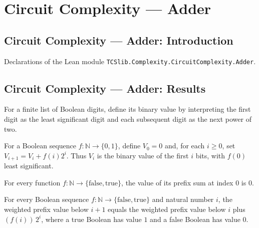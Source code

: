 \section{Circuit Complexity --- Adder}
\subsection*{Circuit Complexity --- Adder: Introduction}

Declarations of the Lean module \texttt{TCSlib.Complexity.CircuitComplexity.Adder}.

\subsection*{Circuit Complexity --- Adder: Results}

\begin{definition}
\label{BoolCircuit.bitsVal}
\leanok
For a finite list of Boolean digits, define its binary value by interpreting the first
digit as the least significant digit and each subsequent digit as the next power of two.
\end{definition}

\begin{definition}
\label{BoolCircuit.prefixVal}
\leanok
For a Boolean sequence $f:\mathbb N\to\{0,1\}$, define $V_0=0$ and, for each $i\ge0$,
set $V_{i+1}=V_i+f(i)2^i$. Thus $V_i$ is the binary value of the first $i$ bits, with
$f(0)$ least significant.
\end{definition}

\begin{theorem}
\label{BoolCircuit.prefixVal_zero}
\leanok
{}
For every function $f:\mathbb{N}\to\{\mathrm{false},\mathrm{true}\}$, the value of its
prefix sum at index $0$ is $0$.
\end{theorem}

\begin{theorem}
\label{BoolCircuit.prefixVal_succ}
\leanok
{}
For every Boolean sequence $f:\mathbb{N}\to\{\mathrm{false},\mathrm{true}\}$ and natural
number $i$, the weighted prefix value below $i+1$ equals the weighted prefix value below
$i$ plus $(f(i))\,2^i$, where a true Boolean has value $1$ and a false Boolean has value
$0$.
\end{theorem}

